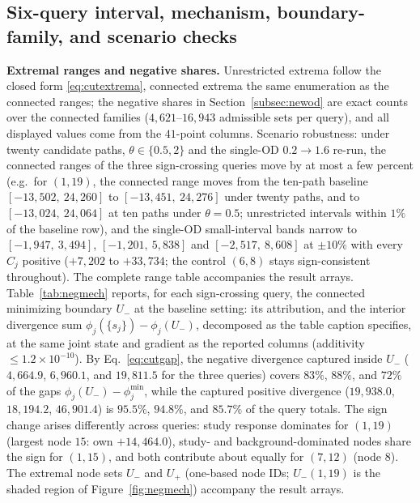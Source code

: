 \subsection{Six-query interval, mechanism, boundary-family, and
scenario checks}\label{supp:newodaccuracy}


\textbf{Extremal ranges and negative shares.}
Unrestricted extrema follow the closed form \eqref{eq:cutextrema},
connected extrema the same enumeration as the connected ranges; the
negative shares in Section~\ref{subsec:newod} are exact counts over
the connected families ($4{,}621$--$16{,}943$ admissible sets per
query), and all displayed values come from the $41$-point columns.
Scenario robustness: under twenty candidate paths, $\theta\in\{0.5,2\}$
and the single-OD $0.2\to1.6$ re-run, the connected ranges of the
three sign-crossing queries move by at most a few percent (e.g.\ for
$(1,19)$, the connected range moves from the ten-path baseline
$[-13{,}502,\ 24{,}260]$ to $[-13{,}451,\ 24{,}276]$ under twenty
paths, and to $[-13{,}024,\ 24{,}064]$ at ten paths under
$\theta=0.5$; unrestricted intervals within $1\%$ of the baseline
row), and the single-OD
small-interval bands narrow to $[-1{,}947,\ 3{,}494]$, $[-1{,}201,\
5{,}838]$ and $[-2{,}517,\ 8{,}608]$ at $\pm10\%$ with every $C_j$
positive ($+7{,}202$ to $+33{,}734$; the control $(6,8)$ stays
sign-consistent throughout). The complete range table accompanies the
result arrays.
Table~\ref{tab:negmech} reports, for each sign-crossing query, the
connected minimizing boundary $U_-$ at the baseline setting: its
attribution, and the interior divergence sum
$\phi_j(\{s_j\})-\phi_j(U_-)$, decomposed as the table caption
specifies, at the same joint state and gradient as the reported
columns (additivity $\le1.2\times10^{-10}$).
By Eq.~\eqref{eq:cutgap}, the negative divergence captured inside
$U_-$ ($4{,}664.9$, $6{,}960.1$, and $19{,}811.5$ for the three
queries) covers $83\%$, $88\%$, and $72\%$ of the gaps
$\phi_j(U_-)-\phi_j^{\min}$, while the captured positive divergence
($19{,}938.0$, $18{,}194.2$, $46{,}901.4$) is $95.5\%$, $94.8\%$,
and $85.7\%$ of the query totals. The sign change arises
differently across queries: study response
dominates for $(1,19)$ (largest node $15$: own $+14{,}464.0$),
study- and background-dominated nodes share the sign for $(1,15)$,
and both contribute about equally for $(7,12)$ (node $8$). The
extremal node sets $U_-$ and $U_+$ (one-based node IDs; $U_-(1,19)$
is the shaded region of Figure~\ref{fig:negmech}) accompany the
result arrays.

